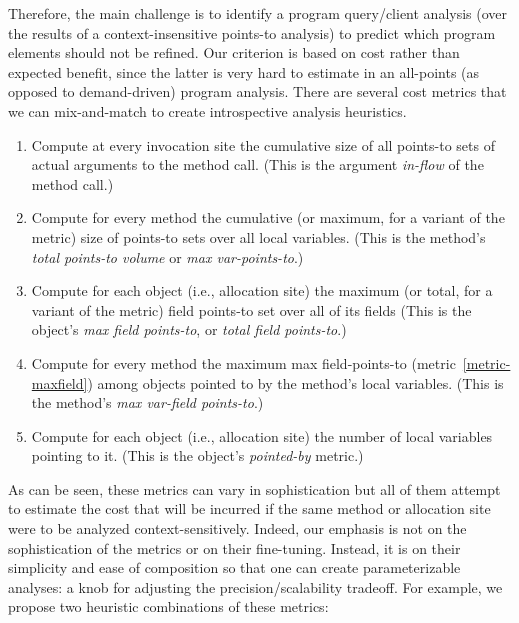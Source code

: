 Therefore, the main challenge is to identify a program query/client
analysis (over the results of a context-insensitive points-to
analysis) to predict which program elements should not be refined. Our
criterion is based on cost rather than expected benefit, since the
latter is very hard to estimate in an all-points (as opposed to
demand-driven) program analysis. There are several cost metrics that
we can mix-and-match to create introspective analysis heuristics.

\begin{enumerate}
\item \label{metric-arginflow} Compute at every invocation site the cumulative
  size of all points-to sets of actual arguments to the method call.
  (This is the argument \emph{in-flow} of the method call.)

\item \label{metric-methvpt} Compute for every method the cumulative
  (or maximum, for a variant of the metric) size of points-to sets
  over all local variables. (This is the method's \emph{total points-to volume}
  or \emph{max var-points-to}.)

\item \label{metric-maxfield} Compute for each object (i.e.,
  allocation site) the maximum (or total, for a variant of the metric)
  field points-to set over all of its fields (This is the object's \emph{max field points-to}, 
  or \emph{total field points-to}.)

\item \label{metric-methodmaxfield} Compute for every method the 
  maximum max field-points-to (metric~\ref{metric-maxfield}) among objects pointed to
  by the method's local variables. (This is the method's \emph{max var-field points-to}.)

\item \label{metric-pointedby} Compute for each object (i.e., allocation site) the
  number of local variables pointing to it. (This is the object's \emph{pointed-by} metric.)
\end{enumerate}

As can be seen, these metrics can vary in sophistication but all of
them attempt to estimate the cost that will be incurred if the same
method or allocation site were to be analyzed
context-sensitively. Indeed, our emphasis is not on the sophistication
of the metrics or on their fine-tuning. Instead, it is on their
simplicity and ease of composition so that one can create
parameterizable analyses: a knob for adjusting the
precision/scalability tradeoff. For example, we propose two heuristic
combinations of these metrics:

